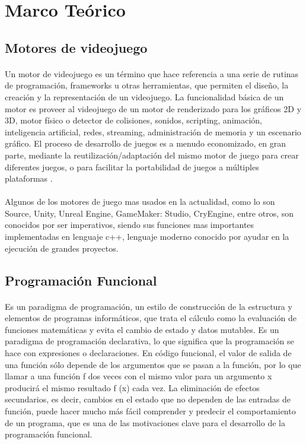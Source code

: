 \documentclass{standalone}
\begin{document}
\section{Marco Teórico}

\subsection{Motores de videojuego}

\paragraph{}
Un motor de videojuego es un término que hace referencia a una serie de rutinas de programación, frameworks u otras herramientas, que permiten el diseño, la creación y la representación de un videojuego. La funcionalidad básica de un motor es proveer al videojuego de un motor de renderizado para los gráficos 2D y 3D, motor físico o detector de colisiones, sonidos, scripting, animación, inteligencia artificial, redes, streaming, administración de memoria y un escenario gráfico. El proceso de desarrollo de juegos es a menudo economizado, en gran parte, mediante la reutilización/adaptación del mismo motor de juego para crear diferentes juegos, o para facilitar la portabilidad de juegos a múltiples plataformas \cite{JasonGregory-GameEngineArchitecture}.

\paragraph{}
Algunos de los motores de juego mas usados en la actualidad, como lo son Source, Unity, Unreal Engine, GameMaker: Studio, CryEngine, entre otros, son conocidos por ser imperativos, siendo sus funciones mas importantes implementadas en lenguaje c++, lenguaje moderno conocido por ayudar en la ejecución de grandes proyectos.

\subsection{Programación Funcional}

\paragraph{}
Es un paradigma de programación, un estilo de construcción de la estructura y elementos de programas informáticos, que trata el cálculo como la evaluación de funciones matemáticas y evita el cambio de estado y datos mutables. Es un paradigma de programación declarativa, lo que significa que la programación se hace con expresiones o declaraciones. En código funcional, el valor de salida de una función sólo depende de los argumentos que se pasan a la función, por lo que llamar a una función f dos veces con el mismo valor para un argumento x producirá el mismo resultado f (x) cada vez. La eliminación de efectos secundarios, es decir, cambios en el estado que no dependen de las entradas de función, puede hacer mucho más fácil comprender y predecir el comportamiento de un programa, que es una de las motivaciones clave para el desarrollo de la programación funcional.
\end{document}
